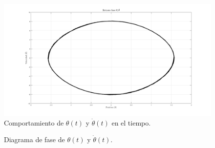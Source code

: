 \begin{figure}[hb]
 \centering 
 \includegraphics[scale=0.35]{./img/faseNF.png}
 \caption{Comportamiento de $\theta(t)$ y $\dot{\theta}(t)$ en el tiempo.}
 \label{fig: time plot theta dtheta}
\end{figure}

\begin{figure}[hb]
 \centering 
\caption{Diagrama de fase de $\theta(t)$ y $\dot{\theta}(t)$.}
 \label{fig: phase plot theta}
\end{figure}



